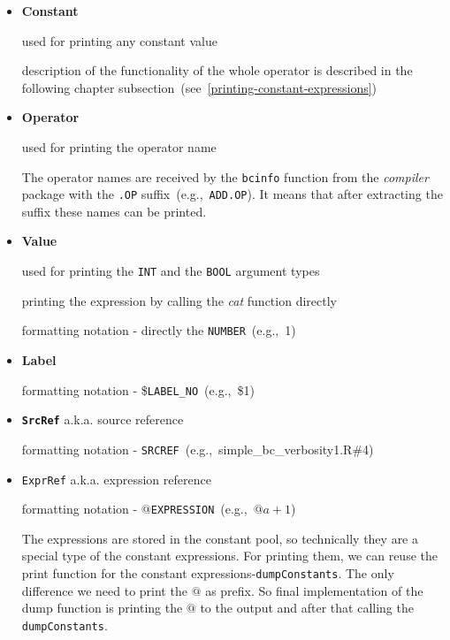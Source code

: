 \documentclass[thesis=M,english]{FITthesis}[2018/10/20]
\newcommand{\code}[1]{\texttt{#1}}
\begin{document}
\begin{itemize}
	\item \textbf{Constant}

		used for printing any constant value

		description of the functionality of the whole operator is described in the following chapter subsection~(see~\ref{printing-constant-expressions})

	\item \textbf{Operator}

		used for printing the operator name

		The operator names are received by the \code{bcinfo} function from the \textit{compiler} package with the \code{.OP} suffix~(e.g.,~\code{ADD.OP}). It means that after extracting the suffix these names can be printed.

	\item \textbf{Value}

		used for printing the \code{INT} and the \code{BOOL} argument types

		printing the expression by calling the \textit{cat} function directly

		formatting notation - directly the \code{NUMBER}~(e.g.,~1)

	\item \textbf{Label}

		formatting notation - \$\code{LABEL{\_}NO}~(e.g.,~\$1)

	\item \textbf{\code{SrcRef}} a.k.a. source reference

		formatting notation - \code{SRCREF}~(e.g.,~simple{\_}bc{\_}verbosity1.R{\#}4)

	\item \code{ExprRef} a.k.a. expression reference

		formatting notation - $@$\code{EXPRESSION}~(e.g.,~$@a+1$)

		The expressions are stored in the constant pool, so technically they are a special type of the constant expressions. For printing them, we can reuse the print function for the constant expressions-\code{dumpConstants}. The only difference we need to print the \code{$@$} as prefix. So final implementation of the dump function is printing the $@$ to the output and after that calling the \code{dumpConstants}.

\end{itemize}

\end{document}
